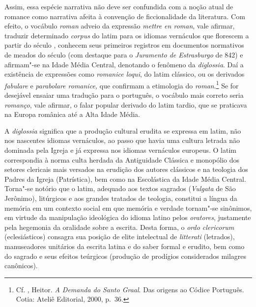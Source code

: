Assim, essa espécie narrativa não deve ser confundida com a noção atual de
romance como narrativa afeita à convenção de ficcionalidade da literatura. Com
efeito, o vocábulo \textit{roman} adveio da expressão \textit{mettre en roman},
vale afirmar, traduzir determinado \textit{corpus} do latim para os idiomas
vernáculos que florescem a partir do século , conhecem seus primeiros
registros em documentos normativos de meados do século  (com destaque para o
\textit{Juramento de Estrasburgo} de 842) e afirmam"-se na Idade Média
Central, denotando o fenômeno da \textit{diglossia}. Daí a existência de
expressões como \textit{romanice loqui}, do latim clássico, ou os derivados
\textit{fabulare} e \textit{parabolare romanice,} que confirmam a etimologia do
\textit{roman}.\footnote{ Cf. , Heitor.\textit{ A Demanda do Santo Graal}.
Das origens ao Códice Português. Cotia: Ateliê Editorial, 2000, p.~36.} Se
for desejável ensaiar uma tradução para o português, o vocábulo mais correto
seria \textit{romanço}, vale afirmar, o falar popular derivado do latim tardio,
que se praticava na Europa românica até a Alta Idade Média. 

A \textit{diglossia} significa que a produção cultural erudita se expressa em latim,
não nos nascentes idiomas vernáculos, ao passo que havia uma cultura letrada
não dominada pela Igreja e já expressa nos idiomas vernáculos europeus. O latim
correspondia à norma culta herdada da Antiguidade Clássica e monopólio dos
setores clericais mais versados na erudição dos autores clássicos e na teologia
dos Padres da Igreja (Patrística), bem como na Escolástica da Idade
Média Central. Torna"-se notório que o latim, adequado aos textos sagrados
(\textit{Vulgata} de São Jerônimo), litúrgicos e aos grandes tratados de
teologia, constitui a língua da memória em um contexto social em que memória e
verdade tornam"-se sinônimos, em virtude da manipulação ideológica do idioma
latino pelos \textit{oratores}, justamente pela hegemonia da
oralidade sobre a escrita. Desta forma, o \textit{ordo clericorum}
(eclesiásticos) consagra sua posição de elite intelectual de \textit{litterati
}(letrados), manuseadores unitários da escrita latina e do saber formal e
erudito, bem como do sagrado e seus efeitos teúrgicos (produção de prodígios
considerados milagres canônicos). 

